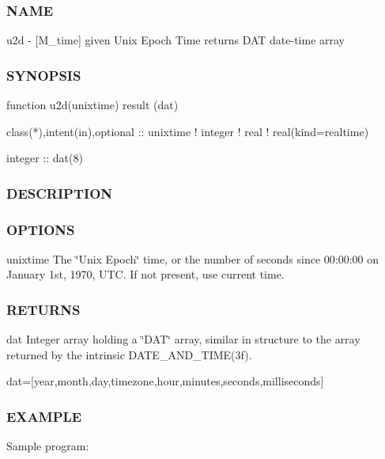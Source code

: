 \begin{DoxyVerb}
\subsubsection*{N\+A\+ME}

u2d -\/ \mbox{[}M\+\_\+time\mbox{]} given Unix Epoch Time returns D\+AT date-\/time array 

\subsubsection*{S\+Y\+N\+O\+P\+S\+IS}

\begin{DoxyVerb}function u2d(unixtime) result (dat)

 class(*),intent(in),optional      :: unixtime
 ! integer
 ! real
 ! real(kind=realtime)

 integer                           :: dat(8)
\end{DoxyVerb}


\subsubsection*{D\+E\+S\+C\+R\+I\+P\+T\+I\+ON}

\subsubsection*{O\+P\+T\+I\+O\+NS}

unixtime The \char`\"{}\+Unix Epoch\char`\"{} time, or the number of seconds since 00\+:00\+:00 on January 1st, 1970, U\+TC. If not present, use current time.

\subsubsection*{R\+E\+T\+U\+R\+NS}

dat Integer array holding a \char`\"{}\+D\+A\+T\char`\"{} array, similar in structure to the array returned by the intrinsic D\+A\+T\+E\+\_\+\+A\+N\+D\+\_\+\+T\+I\+M\+E(3f).

dat=\mbox{[}year,month,day,timezone,hour,minutes,seconds,milliseconds\mbox{]}

\subsubsection*{E\+X\+A\+M\+P\+LE}

\begin{DoxyVerb}Sample program:


\end{DoxyVerb}
\end{DoxyVerb}

